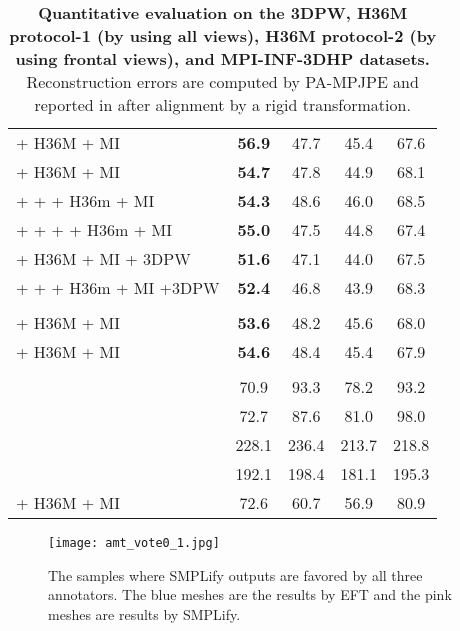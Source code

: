 \documentclass[10pt,twocolumn,letterpaper]{article}
\begin{document}
\begin{table*}[t]
\begin{tabular}{lcccc}
			 + H36M + MI   & \textbf{56.9} & 47.7 & 45.4 & 67.6\\
			 + H36M + MI    & \textbf{54.7}  & 47.8 & 44.9 & 68.1\\
			
			 +  + + H36m + MI  & \textbf{54.3}  & 48.6 & 46.0  & 68.5\\
			
			 +  + +  + H36m + MI  & \textbf{55.0}  & 47.5 & 44.8  & 67.4\\
			
			 + H36M + MI + 3DPW & \textbf{51.6}  & 47.1 & 44.0  & 67.5\\
			 +  + + H36m + MI +3DPW  & \textbf{52.4}  & 46.8 & 43.9  & 68.3\\
			
			\midrule
			\rowcolor{white}
			\multicolumn{3}{l}{\textbf{with Crop Augmentation}}\\
			\midrule
			 + H36M + MI    & \textbf{53.6}  & 48.2 & 45.6 & 68.0\\
			 + H36M + MI    & \textbf{54.6}  & 48.4 & 45.4 & 67.9 \\
			
			\midrule
			\rowcolor{white}
			\multicolumn{1}{l}{\textbf{Alternative Approaches}}\\
			\midrule
			 & 70.9  & 93.3 & 78.2 & 93.2\\
			   & 72.7 & 87.6 & 81.0 & 98.0\\
			
			 & 228.1 &  236.4 & 213.7 & 218.8\\
			 & 192.1 & 198.4 & 181.1 & 195.3\\
			 + H36M + MI & 72.6 &  60.7 & 56.9 & 80.9\\
			
			
			\bottomrule
		\end{tabular}
		\caption{
			\textbf{Quantitative evaluation on the 3DPW, H36M protocol-1 (by using all views), H36M protocol-2 (by using frontal views), and MPI-INF-3DHP datasets.} Reconstruction errors are computed by PA-MPJPE and  reported in  after alignment by a rigid transformation. 
			\label{table:quant_public_db_full}}
	\end{table*}
	
	
	
	
	\begin{figure*}[t]
		\centering
		\texttt{[image: amt\_vote0\_1.jpg]}
		\caption{The samples where SMPLify outputs are favored by all three annotators. The blue meshes are the results by EFT and the pink meshes are results by SMPLify. }\label{fig:amt_vote0_1}
	\end{figure*}
	
\end{document}
